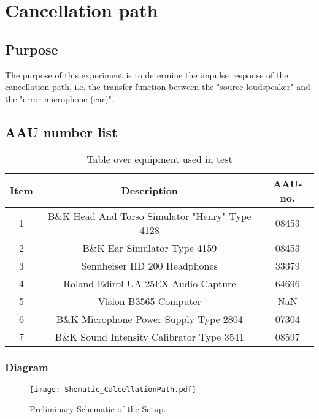 \section{Cancellation path}
\subsection{Purpose}
The purpose of this experiment is to determine the impulse response of the cancellation path, i.e. the transfer-function between the "source-loudspeaker" and the "error-microphone (ear)".
		
\subsection{AAU number list}
\begin{table}[h]
	\centering
	\begin{tabular}{ c c c } \toprule
		{Item}	& {Description} 						& {AAU-no}. \\ \bottomrule 
		1	&	B\&K Head And Torso Simulator "Henry" Type 4128	& 08453		\\
		2	&	B\&K Ear Simulator Type 4159			& 08453		\\
		3	&	Sennheiser HD 200	Headphones			& 33379		\\
		4	&	Roland Edirol UA-25EX Audio Capture		& 64696		\\
		5	&	Vision B3565 Computer					& NaN		\\
		6	&	B\&K Microphone Power Supply Type 2804	& 07304		\\
		7	&	B\&K Sound Intensity Calibrator Type 3541	& 08597	\\ \bottomrule
	\end{tabular}
	\caption{Table over equipment used in test}
	\label{tab:UsedEquipmentListningCP}
\end{table}

\subsubsection{Diagram}
\begin{figure}[H]
	\centering
	\texttt{[image: Shematic\_CalcellationPath.pdf]}
	\caption{Preliminary Schematic of the Setup.}
	\label{Schematic}
\end{figure}

